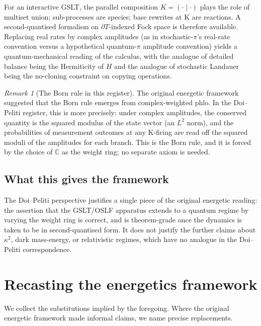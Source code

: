 \documentclass[11pt]{article}
\theoremstyle{plain}
\theoremstyle{definition}
\theoremstyle{remark}
\newtheorem{remark}[theorem]{Remark}
\newcommand{\C}{\mathbb{C}}
\newcommand{\bd}{\partial}
\begin{document}
For an interactive GSLT, the parallel composition $K = (\cdot \mid \cdot)$ plays the role of multiset union; sub-processes are species; base rewrites at K are reactions. A second-quantised formalism on $\bd T$-indexed Fock space is therefore available. Replacing real rates by complex amplitudes (as in stochastic-$\pi$'s real-rate convention versus a hypothetical quantum-$\pi$ amplitude convention) yields a quantum-mechanical reading of the calculus, with the analogue of detailed balance being the Hermiticity of $H$ and the analogue of stochastic Landauer being the no-cloning constraint on copying operations.

\begin{remark}[The Born rule in this register]
The original energetic framework \cite{energetics-context} suggested that the Born rule emerges from complex-weighted phlo. In the Doi--Peliti register, this is more precisely: under complex amplitudes, the conserved quantity is the squared modulus of the state vector (an $L^2$ norm), and the probabilities of measurement outcomes at any K-firing are read off the squared moduli of the amplitudes for each branch. This is the Born rule, and it is forced by the choice of $\C$ as the weight ring; no separate axiom is needed.
\end{remark}

\subsection{What this gives the framework}

The Doi--Peliti perspective justifies a single piece of the original energetic reading: the assertion that the GSLT/OSLF apparatus extends to a quantum regime by varying the weight ring is correct, and is theorem-grade once the dynamics is taken to be in second-quantised form. It does not justify the further claims about $\kappa^2$, dark mass-energy, or relativistic regimes, which have no analogue in the Doi--Peliti correspondence.

\section{Recasting the energetics framework}\label{sec:recast}

We collect the substitutions implied by the foregoing. Where the original energetic framework \cite{energetics-context} made informal claims, we name precise replacements.
\end{document}
